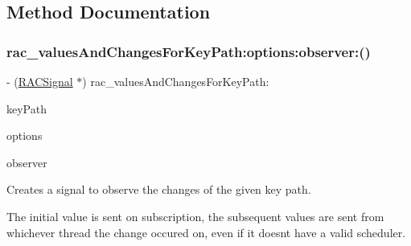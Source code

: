 \subsection{Method Documentation}
\mbox{\label{category_n_s_object_07_r_a_c_property_subscribing_08_a0cfc29dcd9e667013645d785d194fd7e}} 
\subsubsection{\texorpdfstring{rac\+\_\+values\+And\+Changes\+For\+Key\+Path\+:options\+:observer\+:()}{rac\_valuesAndChangesForKeyPath:options:observer:()}\hspace{0.1cm}{\footnotesize\ttfamily [1/3]}}
{\footnotesize\ttfamily -\/ (\mbox{\hyperlink{interface_r_a_c_signal}{R\+A\+C\+Signal}} $\ast$) rac\+\_\+values\+And\+Changes\+For\+Key\+Path\+: \begin{DoxyParamCaption}\item[{(N\+S\+String $\ast$)}]{key\+Path }\item[{options:(N\+S\+Key\+Value\+Observing\+Options)}]{options }\item[{observer:(\+\_\+\+\_\+weak N\+S\+Object $\ast$)}]{observer }\end{DoxyParamCaption}}

Creates a signal to observe the changes of the given key path.

The initial value is sent on subscription, the subsequent values are sent from whichever thread the change occured on, even if it doesn\textquotesingle{}t have a valid scheduler.

